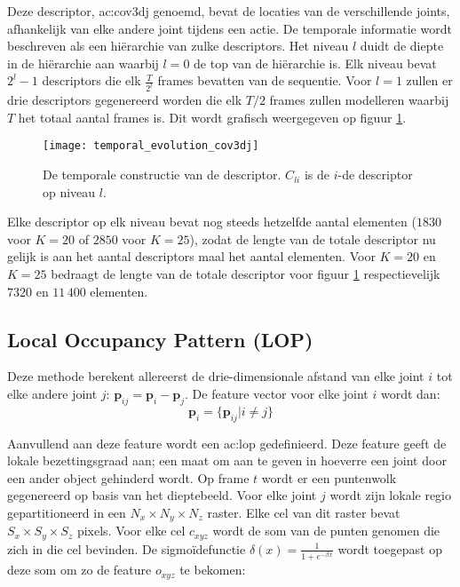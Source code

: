 Deze descriptor, \gls{ac:cov3dj} genoemd, bevat de locaties van de verschillende joints, afhankelijk van elke andere joint tijdens een actie. De temporale informatie wordt beschreven als een hiërarchie van zulke descriptors. Het niveau $l$ duidt de diepte in de hiërarchie aan waarbij $l = 0$ de top van de hiërarchie is. Elk niveau bevat $2^l - 1$ descriptors die elk $\frac{T}{2^l}$ frames bevatten van de sequentie. Voor $l = 1$ zullen er drie descriptors gegenereerd worden die elk $T/2$ frames zullen modelleren waarbij $T$ het totaal aantal frames is. Dit wordt grafisch weergegeven op figuur \ref{fig:temporal_evolution_cov3dj}.

\begin{figure}
	\centering
	\texttt{[image: temporal\_evolution\_cov3dj]}
	\caption{De temporale constructie van de descriptor. $C_{li}$ is de $i$-de descriptor op niveau $l$. }
	\label{fig:temporal_evolution_cov3dj}
\end{figure}

Elke descriptor op elk niveau bevat nog steeds hetzelfde aantal elementen ($1830$ voor $K = 20$ of $2850$ voor $K = 25$), zodat de lengte van de totale descriptor nu gelijk is aan het aantal descriptors maal het aantal elementen. Voor $K = 20$ en $K = 25$ bedraagt de lengte van de totale descriptor voor figuur \ref{fig:temporal_evolution_cov3dj} respectievelijk $7320$ en $11\,400$ elementen. 


\subsection{Local Occupancy Pattern (LOP)}
Deze methode \cite{Wang2012b} berekent allereerst de drie-dimensionale afstand van elke joint $i$ tot elke andere joint $j$: $\textbf{p}_{ij} = \textbf{p}_i - \textbf{p}_j$. De feature vector voor elke joint $i$ wordt dan:
$$\textbf{p}_i = \{\textbf{p}_{ij} | i \neq j \}$$

Aanvullend aan deze feature wordt een \gls{ac:lop} gedefinieerd. Deze feature geeft de lokale bezettingsgraad aan; een maat om aan te geven in hoeverre een joint door een ander object gehinderd wordt. Op frame $t$ wordt er een puntenwolk gegenereerd op basis van het dieptebeeld. Voor elke joint $j$ wordt zijn lokale regio gepartitioneerd in een $N_x \times N_y \times N_z$ raster. Elke cel van dit raster bevat $S_x \times S_y \times S_z$ pixels. Voor elke cel $c_{xyz}$ wordt de som van de punten genomen die zich in die cel bevinden. De sigmoïdefunctie $\delta(x) = \frac{1}{1 + e^{-\beta x}}$ wordt toegepast op deze som om zo de feature $o_{xyz}$ te bekomen:


